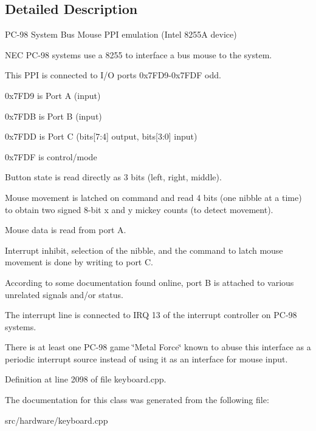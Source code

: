 \subsection{Detailed Description}
P\-C-\/98 System Bus Mouse P\-P\-I emulation (Intel 8255\-A device) 

N\-E\-C P\-C-\/98 systems use a 8255 to interface a bus mouse to the system.

This P\-P\-I is connected to I/\-O ports 0x7\-F\-D9-\/0x7\-F\-D\-F odd.
\begin{DoxyItemize}
\item 0x7\-F\-D9 is Port A (input)
\item 0x7\-F\-D\-B is Port B (input)
\item 0x7\-F\-D\-D is Port C (bits\mbox{[}7\-:4\mbox{]} output, bits\mbox{[}3\-:0\mbox{]} input)
\item 0x7\-F\-D\-F is control/mode
\end{DoxyItemize}

Button state is read directly as 3 bits (left, right, middle).

Mouse movement is latched on command and read 4 bits (one nibble at a time) to obtain two signed 8-\/bit x and y mickey counts (to detect movement).

Mouse data is read from port A.

Interrupt inhibit, selection of the nibble, and the command to latch mouse movement is done by writing to port C.

According to some documentation found online, port B is attached to various unrelated signals and/or status.

The interrupt line is connected to I\-R\-Q 13 of the interrupt controller on P\-C-\/98 systems.

There is at least one P\-C-\/98 game \char`\"{}\-Metal Force\char`\"{} known to abuse this interface as a periodic interrupt source instead of using it as an interface for mouse input. 

Definition at line 2098 of file keyboard.\-cpp.



The documentation for this class was generated from the following file\-:\begin{DoxyCompactItemize}
\item 
src/hardware/keyboard.\-cpp\end{DoxyCompactItemize}
